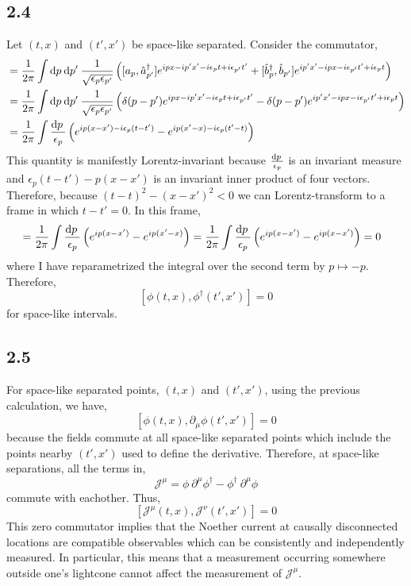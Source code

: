 \documentclass[12pt]{extarticle}
\begin{document}
\subsection*{2.4}
Let $(t, x)$ and $(t', x')$ be space-like separated. Consider the commutator,
\begin{align*}
[ \phi(t, x), \phi^\dagger(t', x')] & = \frac{1}{2 \pi} \int \d{p} \d{p'} \frac{1}{\sqrt{\epsilon_p \epsilon_{p'}}} \left( [a_p, \adag_{p'}] e^{i p x - i p' x' - i \epsilon_p t + i \epsilon_{p'} t'} + [\bdag_p, \b_{p'}] e^{i p' x' - i p x - i \epsilon_{p'} t' + i \epsilon_{p} t} \right)
\\
& = \frac{1}{2 \pi} \int \d{p} \d{p'} \frac{1}{\sqrt{\epsilon_p \epsilon_{p'}}} \left( \delta(p - p') e^{i p x - i p' x' - i \epsilon_p t + i \epsilon_{p'} t'} - \delta(p - p') e^{i p' x' - i p x - i \epsilon_{p'} t' + i \epsilon_{p} t} \right)
\\
& = \frac{1}{2 \pi} \int \frac{\d{p}}{\epsilon_p} \left( e^{i p(x - x') - i \epsilon_p (t - t')} - e^{i p (x' - x) - i \epsilon_p (t' - t)} \right)
\end{align*} 
This quantity is manifestly Lorentz-invariant because $\frac{\mathrm{d}p \:}{\epsilon_p}$ is an invariant measure and $\epsilon_p (t - t') - p (x - x')$ is an invariant inner product of four vectors. Therefore, because $(t - t)^2 - (x - x')^2 < 0$ we can Lorentz-transform to a frame in which $t - t' = 0$. In this frame,
\begin{align*}
[ \phi(t, x), \phi^\dagger(t', x')] & = \frac{1}{2 \pi} \int \frac{\d{p}}{\epsilon_p} \left( e^{i p(x - x')} - e^{i p (x' - x)} \right) = \frac{1}{2 \pi} \int \frac{\d{p}}{\epsilon_p} \left( e^{i p(x - x')} - e^{i p (x - x')} \right) = 0
\end{align*}
where I have reparametrized the integral over the second term by $p \mapsto -p$. 
Therefore,
\[ [ \phi(t, x), \phi^\dagger(t', x')] = 0\]
for space-like intervals. 
\subsection*{2.5}
For space-like separated points, $(t, x)$ and $(t', x')$, using the previous calculation, we have,
\[ [\phi(t, x), \partial_\mu \phi(t', x')] = 0\]
because the fields commute at all space-like separated points which include the points nearby $(t', x')$ used to define the derivative. Therefore, at space-like separations, all the terms in,
\[ \mathcal{J}^\mu = \phi \: \partial^\mu \phi^\dagger - \phi^\dagger \: \partial^\mu \phi \]
commute with eachother. Thus,
\[ [\mathcal{J}^\mu(t, x), \mathcal{J}^\nu(t', x')] = 0\]
This zero commutator implies that the Noether current at causally disconnected locations are compatible observables which can be consistently and independently measured. In particular, this means that a measurement occurring somewhere outside one's lightcone cannot affect the measurement of $\mathcal{J}^\mu$.
\end{document}
